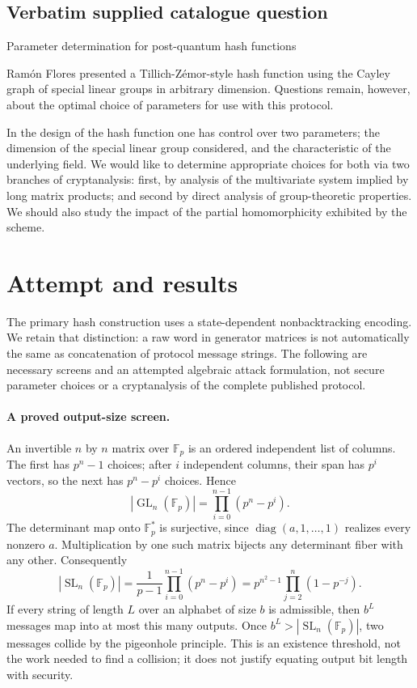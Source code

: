 \documentclass[11pt]{article}
\begin{document}
\subsection{Verbatim supplied catalogue question}
Parameter determination for post-quantum hash functions

Ramón Flores presented a Tillich-Zémor-style hash function using the Cayley graph of special linear groups in arbitrary dimension. Questions remain, however, about the optimal choice of parameters for use with this protocol.

In the design of the hash function one has control over two parameters; the dimension of the special linear group considered, and the characteristic of the underlying field. We would like to determine appropriate choices for both via two branches of cryptanalysis: first, by analysis of the multivariate system implied by long matrix products; and second by direct analysis of group-theoretic properties. We should also study the impact of the partial homomorphicity exhibited by the scheme.

\section{Attempt and results}
The primary hash construction uses a state-dependent nonbacktracking encoding.
We retain that distinction: a raw word in generator matrices is not automatically
the same as concatenation of protocol message strings. The following are
necessary screens and an attempted algebraic attack formulation, not secure
parameter choices or a cryptanalysis of the complete published protocol.

\paragraph{A proved output-size screen.}
An invertible $n$ by $n$ matrix over $\mathbb F_p$ is an ordered independent
list of columns. The first has $p^n-1$ choices; after $i$ independent columns,
their span has $p^i$ vectors, so the next has $p^n-p^i$ choices. Hence
\[
|\operatorname{GL}_n(\mathbb F_p)|=\prod_{i=0}^{n-1}(p^n-p^i).
\]
The determinant map onto $\mathbb F_p^*$ is surjective, since
$\operatorname{diag}(a,1,\ldots,1)$ realizes every nonzero $a$.
Multiplication by one such matrix bijects any determinant fiber with any other.
Consequently
\[
|\operatorname{SL}_n(\mathbb F_p)|=\frac1{p-1}\prod_{i=0}^{n-1}(p^n-p^i)
=p^{n^2-1}\prod_{j=2}^n(1-p^{-j}).
\]
If every string of length $L$ over an alphabet of size $b$ is admissible,
then $b^L$ messages map into at most this many outputs. Once
$b^L>|\operatorname{SL}_n(\mathbb F_p)|$, two messages collide by the
pigeonhole principle. This is an existence threshold, not the work needed to
find a collision; it does not justify equating output bit length with security.
\end{document}

